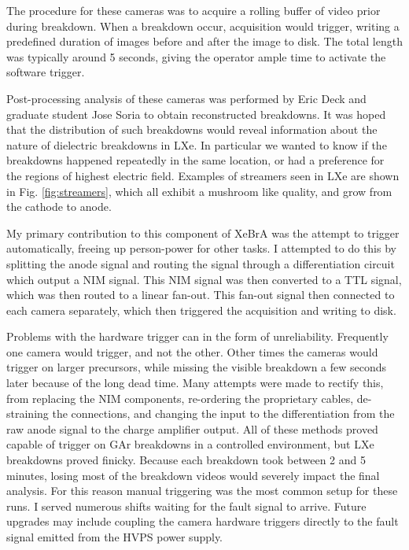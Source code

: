 The procedure for these cameras was to acquire a rolling buffer of video prior during breakdown. 
When a breakdown occur, acquisition would trigger, writing a predefined duration of images before and after the image to disk.
The total length was typically around 5 seconds, giving the operator ample time to activate the software trigger.

Post-processing analysis of these cameras was performed by Eric Deck and graduate student Jose Soria to obtain reconstructed breakdowns.
It was hoped that the distribution of such breakdowns would reveal information about the nature of dielectric breakdowns in LXe.
In particular we wanted to know if the breakdowns happened repeatedly in the same location, or had a preference for the regions of highest electric field.
Examples of streamers seen in LXe are shown in Fig. \ref{fig:streamers}, which all exhibit a mushroom like quality, and grow from the cathode to anode.

My primary contribution to this component of XeBrA was the attempt to trigger automatically, freeing up person-power for other tasks.
I attempted to do this by splitting the anode signal and routing the signal through a differentiation circuit which output a NIM signal.
This NIM signal was then converted to a TTL signal, which was then routed to a linear fan-out.
This fan-out signal then connected to each camera separately, which then triggered the acquisition and writing to disk.

Problems with the hardware trigger can in the form of unreliability.
Frequently one camera would trigger, and not the other.
Other times the cameras would trigger on larger precursors, while missing the visible breakdown a few seconds later because of the long dead time.
Many attempts were made to rectify this, from replacing the NIM components, re-ordering the proprietary cables, de-straining the connections, and changing the input to the differentiation from the raw anode signal to the charge amplifier output.
All of these methods proved capable of trigger on GAr breakdowns in a controlled environment, but LXe breakdowns proved finicky.
Because each breakdown took between 2 and 5 minutes, losing most of the breakdown videos would severely impact the final analysis.
For this reason manual triggering was the most common setup for these runs.
I served numerous shifts waiting for the fault signal to arrive.
Future upgrades may include coupling the camera hardware triggers directly to the fault signal emitted from the HVPS power supply.

